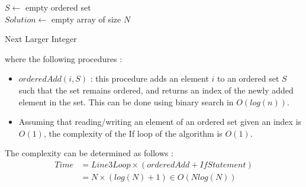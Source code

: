 

\begin{algorithm}[H]
\SetAlgoLined
{}
$S \gets $ empty ordered set\\
$Solution \gets $ empty array of size $N$ \\
\caption{Next Larger Integer}
\end{algorithm}

where the following procedures :
\begin{itemize}
\item{$orderedAdd(i,S)$ : this procedure adds an element $i$ to an ordered set $S$ such that the set remains ordered, and returns an index of the newly added element in the set. This can be done using binary search in $O(log(n))$.}
\item{Assuming that reading/writing an element of an ordered set given an index is $O(1)$, the complexity of the If loop of the algorithm is $O(1)$.}
\end{itemize}

The complexity can be determined as follows : 
\begin{align*}
Time & = Line3Loop \times (orderedAdd + IfStatement ) \\ 
& = N \times ( log(N) + 1) \in O(N log(N)) 
\end{align*}